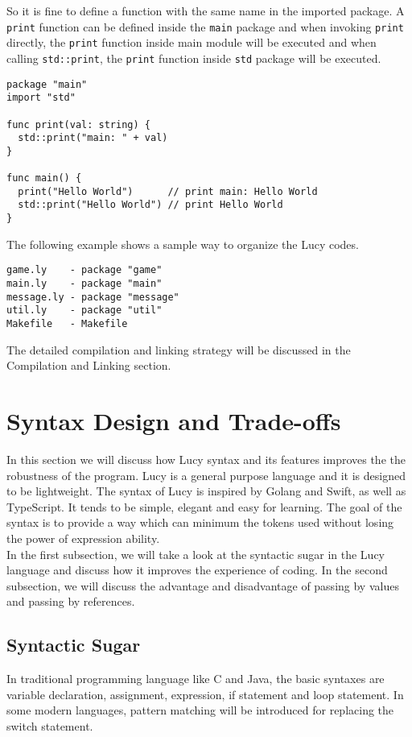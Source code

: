 So it is fine to define a function with the same name in the imported package. A \texttt{print} function can be defined inside the \texttt{main} package and when invoking \texttt{print} directly, the \texttt{print} function inside main module will be executed and when calling \texttt{std::print}, the \texttt{print} function inside \texttt{std} package will be executed.
\begin{lstlisting}
package "main"
import "std"

func print(val: string) {
  std::print("main: " + val)
}

func main() {
  print("Hello World")      // print main: Hello World
  std::print("Hello World") // print Hello World
}
\end{lstlisting}
The following example shows a sample way to organize the Lucy codes.
\begin{lstlisting}
game.ly    - package "game"
main.ly    - package "main"
message.ly - package "message"
util.ly    - package "util"
Makefile   - Makefile
\end{lstlisting}
The detailed compilation and linking strategy will be discussed in the Compilation and Linking section.


\section{Syntax Design and Trade-offs}
In this section we will discuss how Lucy syntax and its features improves the the robustness of the program. Lucy is a general purpose language and it is designed to be lightweight. The syntax of Lucy is inspired by Golang and Swift, as well as TypeScript. It tends to be simple, elegant and easy for learning. The goal of the syntax is to provide a way which can minimum the tokens used without losing the power of expression ability. \\
In the first subsection, we will take a look at the syntactic sugar in the Lucy language and discuss how it improves the experience of coding. In the second subsection, we will discuss the advantage and disadvantage of passing by values and passing by references.

\subsection{Syntactic Sugar}
In traditional programming language like C and Java, the basic syntaxes are variable declaration, assignment, expression, if statement and loop statement. In some modern languages, pattern matching will be introduced for replacing the switch statement.

